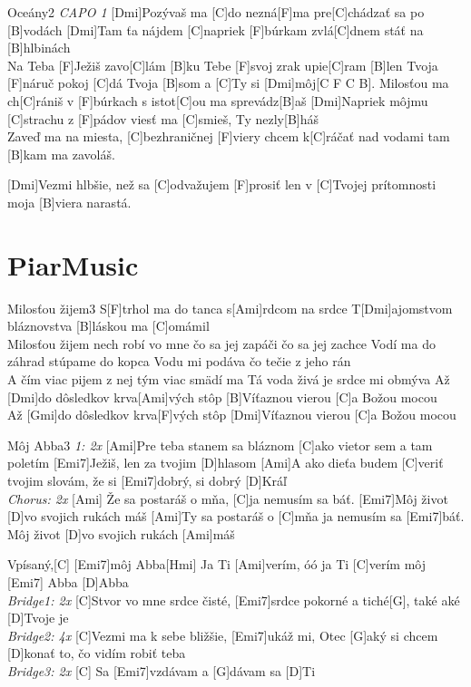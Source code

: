 \documentclass[12pt]{article}
\begin{document}
\begin{song}{Oceány}{2}
\textit{\color{gray}CAPO 1}
[Dmi]Pozývaš ma [C]do nezná[F]ma
pre[C]chádzať sa po [B]vodách
[Dmi]Tam ťa nájdem [C]napriek [F]búrkam
zvlá[C]dnem stáť na [B]hlbinách
\\
[B]Na Teba [F]Ježiš zavo[C]lám
[B]ku Tebe [F]svoj zrak upie[C]ram
[B]len Tvoja [F]náruč pokoj [C]dá
Tvoja [B]som a [C]Ty si [Dmi]môj[C F C B].
\columnbreak
[Dmi]Milosťou ma ch[C]rániš v [F]búrkach
s istot[C]ou ma sprevádz[B]aš
[Dmi]Napriek môjmu [C]strachu z [F]pádov
viesť ma [C]smieš, Ty nezly[B]háš
\\
[Dmi]Zaveď ma na miesta, [C]bezhraničnej [F]viery
chcem k[C]ráčať nad vodami
tam [B]kam ma zavoláš.

[Dmi]Vezmi hlbšie, než sa [C]odvažujem [F]prosiť
len v [C]Tvojej prítomnosti
moja [B]viera narastá.
\end{song}

\newpage
\section{PiarMusic}


\begin{song}{Milosťou žijem}{3}
	S[F]trhol ma do tanca
	s[Ami]rdcom na srdce
	T[Dmi]ajomstvom bláznovstva
	[B]láskou ma [C]omámil
	\\
	Milosťou žijem
	nech robí vo mne
	čo sa jej zapáči
	čo sa jej zachce
	\columnbreak
	Vodí ma do záhrad
	stúpame do kopca
	Vodu mi podáva
	čo tečie z jeho rán
	\\
	A čím viac pijem z nej
	tým viac smädí ma
	Tá voda živá je
	srdce mi obmýva
	\columnbreak
	Až [Dmi]do dôsledkov
	krva[Ami]vých stôp
	[B]Víťaznou vierou
	[C]a Božou mocou
	\\
	Až [Gmi]do dôsledkov
	krva[F]vých stôp
	[Dmi]Víťaznou vierou
	[C]a Božou mocou
\end{song}

\begin{song}{Môj Abba}{3}
\textit{\color{gray} 1: 2x}
[Ami]Pre teba stanem sa bláznom
[C]ako vietor sem a tam poletím
[Emi7]Ježiš, len za tvojim [D]hlasom
[Ami]A ako dieťa budem [C]veriť
tvojim slovám, že si [Emi7]dobrý,
si dobrý [D]Kráľ
\\
\textit{\color{gray} Chorus: 2x}
[Ami] Že sa postaráš o mňa,
[C]ja nemusím sa báť.
[Emi7]Môj život [D]vo svojich rukách máš
[Ami]Ty sa postaráš o [C]mňa
ja nemusím sa [Emi7]báť.
Môj život [D]vo svojich rukách [Ami]máš

Vpísaný,[C] [Emi7]môj Abba[Hmi]
Ja Ti [Ami]verím, óó ja Ti [C]verím
môj [Emi7] Abba [D]Abba
\\
\textit{\color{gray} Bridge1: 2x}
[C]Stvor vo mne srdce čisté,
[Emi7]srdce pokorné a tiché[G],
také aké [D]Tvoje je
\\
\textit{\color{gray} Bridge2: 4x}
[C]Vezmi ma k sebe bližšie,
[Emi7]ukáž mi, Otec [G]aký si
chcem [D]konať to, čo vidím robiť teba
\\
\textit{\color{gray} Bridge3: 2x}
[C] Sa [Emi7]vzdávam a [G]dávam sa [D]Ti
\end{song}
\end{document}
